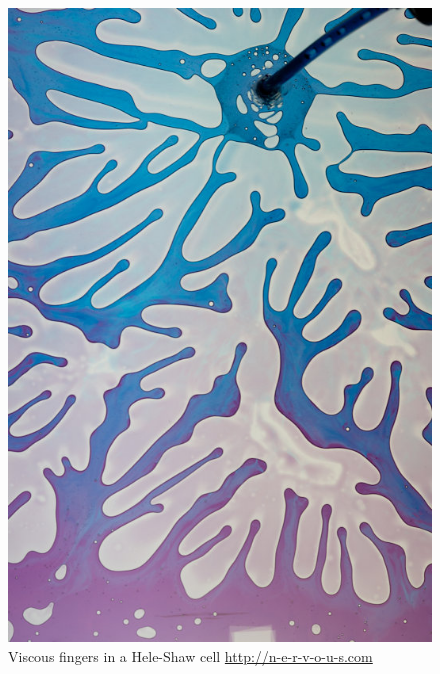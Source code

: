 \documentclass[screen, aspectratio=43]{beamer}
\begin{document}
\begin{frame}
{\begin{columns}
\begin{column}{0.25\textwidth}
\begin{figure}[h]
          \includegraphics[trim={0 0 5cm 0}, clip, width = \textwidth]{figures/misc/mf}
          \caption{\scriptsize Viscous fingers in a Hele-Shaw cell
            {\tiny \url{http://n-e-r-v-o-u-s.com}}}
        \end{figure}
      \end{column}
    \end{columns}
  }
\end{frame}
\end{document}
